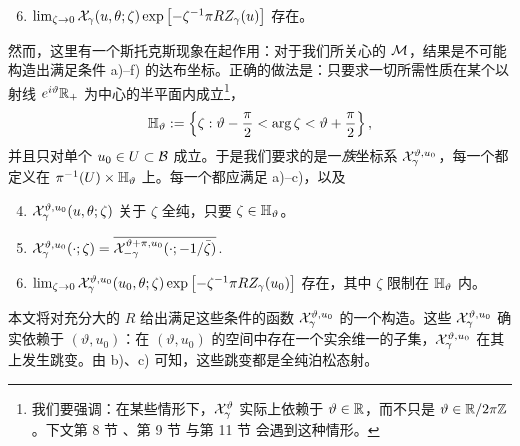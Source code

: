 \begin{enumerate}[label=\alph*)]
\setcounter{enumi}{5}

\item $\lim_{\zeta \to 0} \mathcal{X}_\gamma(u, \theta; \zeta) \exp \left[ - \zeta^{-1} \pi R Z_\gamma(u) \right]$ 存在。

\end{enumerate}

然而，这里有一个斯托克斯现象在起作用：对于我们所关心的 $\mathcal{M}$，结果是不可能构造出满足条件 a)–f) 的达布坐标。正确的做法是：只要求一切所需性质在某个以射线 $e^{i \vartheta}\mathbb{R}_+$ 为中心的半平面内成立\footnote{我们要强调：在某些情形下，$\mathcal{X}_\gamma^\vartheta$ 实际上依赖于 $\vartheta \in \mathbb{R}$，而不只是 $\vartheta \in \mathbb{R}/2\pi\mathbb{Z}$。下文第 8 节%
、第 9 节%
与第 11 节%
会遇到这种情形。}，
\begin{equation} \label{ch2:eq:halfplane}
{\mathbb{H}}_\vartheta := \left\{ \zeta: \vartheta-\frac{\pi}{2} < \arg \zeta < \vartheta+\frac{\pi}{2} \right\},
\end{equation}
并且只对单个 $u_0 \in U \subset \mathcal{B}$ 成立。于是我们要求的是一\emph{族}坐标系 $\mathcal{X}_\gamma^{\vartheta, u_0}$，每一个都定义在 $\pi^{-1}(U) \times {\mathbb{H}}_\vartheta$ 上。每一个都应满足 a)–c)，以及

\begin{enumerate}[label=\alph*')]
\setcounter{enumi}{3}

\item $\mathcal{X}^{\vartheta, u_0}_\gamma(u, \theta; \zeta)$ 关于 $\zeta$ 全纯，只要 $\zeta \in {\mathbb{H}}_\vartheta$。

\item $\mathcal{X}^{\vartheta, u_0}_{\gamma}(\cdot; \zeta) = \overline{\mathcal{X}^{\vartheta+\pi, u_0}_{-\gamma}(\cdot; -1/\bar\zeta)}$.

\item $\lim_{\zeta \to 0} \mathcal{X}_\gamma^{\vartheta, u_0}(u_0, \theta; \zeta) \exp \left[ - \zeta^{-1} \pi R Z_\gamma(u_0) \right]$ 存在，其中 $\zeta$ 限制在 ${\mathbb{H}}_\vartheta$ 内。

\end{enumerate}

本文将对充分大的 $R$ 给出满足这些条件的函数 $\mathcal{X}_\gamma^{\vartheta, u_0}$ 的一个构造。这些 $\mathcal{X}_\gamma^{\vartheta, u_0}$ 确实依赖于 $(\vartheta, u_0)$：在 $(\vartheta, u_0)$ 的空间中存在一个实余维一的子集，$\mathcal{X}_\gamma^{\vartheta, u_0}$ 在其上发生跳变。由 b)、c) 可知，这些跳变都是全纯泊松态射。

